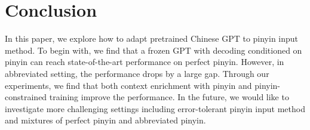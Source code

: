 \section{Conclusion}

In this paper, we explore how to adapt pretrained Chinese GPT to pinyin input method.
To begin with, we find that a frozen GPT with decoding conditioned on pinyin can reach state-of-the-art performance on perfect pinyin. 
However, in abbreviated setting, the performance drops by a large gap.
Through our experiments, we find that both context enrichment with pinyin and pinyin-constrained training improve the performance.
In the future, we would like to investigate more challenging settings including error-tolerant pinyin input method and mixtures of perfect pinyin and abbreviated pinyin.
